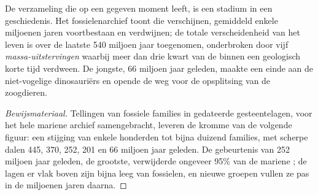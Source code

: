 \begin{proposition}\label{prop:g10:biodiversity-scales:changes}
De verzameling  die op een gegeven moment leeft, is een stadium
in een geschiedenis. Het fossielenarchief toont  die verschijnen,
gemiddeld enkele miljoenen jaren voortbestaan en verdwijnen; de totale
verscheidenheid van het leven is over de laatste 540 miljoen jaar
toegenomen, onderbroken door vijf
\emph{massa-uitstervingen} waarbij meer dan
drie kwart van de  binnen een geologisch korte tijd verdween. De
jongste, 66 miljoen jaar geleden, maakte een einde aan de niet-vogelige
dinosauriërs en opende de weg voor de opsplitsing van de zoogdieren.
\end{proposition}
\begin{proof}[Bewijsmateriaal]
Tellingen van fossiele families in gedateerde gesteentelagen, voor het
hele mariene archief samengebracht, leveren de kromme van de volgende
figuur: een stijging van enkele honderden tot bijna duizend families,
met scherpe dalen 445, 370, 252, 201 en 66 miljoen jaar geleden. De
gebeurtenis van 252 miljoen jaar geleden, de grootste, verwijderde
ongeveer 95\% van de mariene ; de lagen er vlak boven zijn bijna
leeg van fossielen, en nieuwe groepen vullen ze pas in de miljoenen
jaren daarna.
\end{proof}

